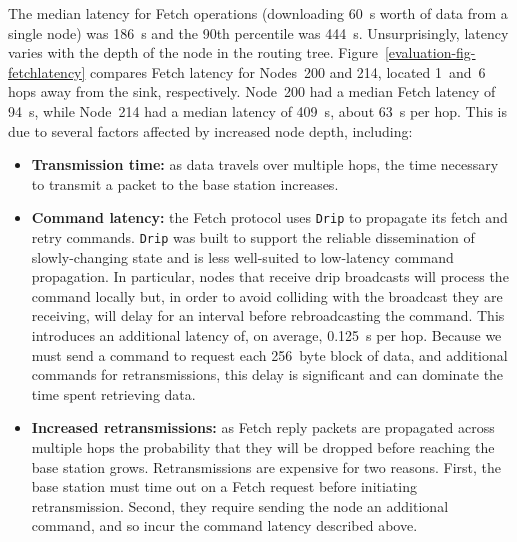 The median latency for Fetch operations (downloading 60~s worth of data from
a single node) was 186~s and the 90th percentile was 444~s. Unsurprisingly,
latency varies with the depth of the node in the routing tree.
Figure~\ref{evaluation-fig-fetchlatency} compares Fetch latency for Nodes~200
and 214, located 1~and~6 hops away from the sink, respectively. Node~200 had
a median Fetch latency of 94~s, while Node~214 had a median latency of 409~s,
about 63~s per hop. This is due to several factors affected by increased node
depth, including:

\begin{itemize}

\item \textbf{Transmission time:} as data travels over multiple hops, the
time necessary to transmit a packet to the base station increases.

\item \textbf{Command latency:} the Fetch protocol uses \texttt{Drip} to
propagate its fetch and retry commands. \texttt{Drip} was built to support
the reliable dissemination of slowly-changing state and is less well-suited
to low-latency command propagation. In particular, nodes that receive drip
broadcasts will process the command locally but, in order to avoid colliding
with the broadcast they are receiving, will delay for an interval before
rebroadcasting the command. This introduces an additional latency of, on
average, 0.125~s per hop. Because we must send a command to request each
256~byte block of data, and additional commands for retransmissions, this
delay is significant and can dominate the time spent retrieving data.

\item \textbf{Increased retransmissions:} as Fetch reply packets are
propagated across multiple hops the probability that they will be dropped
before reaching the base station grows. Retransmissions are expensive for two
reasons. First, the base station must time out on a Fetch request before
initiating retransmission. Second, they require sending the node an
additional command, and so incur the command latency described above.

\end{itemize}
